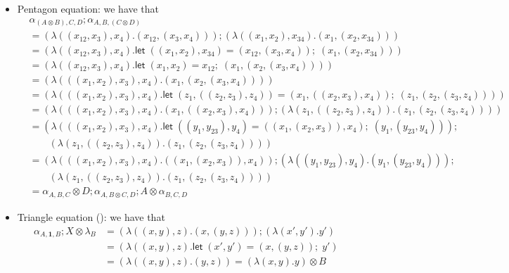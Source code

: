 \documentclass[acmsmall,screen,review]{acmart}
\newcommand{\mb}[1]{\ensuremath{\mathbf{#1}}}
\newcommand{\ms}[1]{\ensuremath{\mathsf{#1}}}
\newcommand{\letexpr}[3]{\ensuremath{\ms{let}\;#1 = #2;\;#3}}
\newcommand{\cmark}{\ding{51}}%
\begin{document}
\begin{itemize}
  \begin{itemize}
    \item Pentagon equation: we have that
    \begin{align*}
      &\alpha_{(A \otimes B), C, D} ; \alpha_{A, B, (C \otimes D)} \\
      &= (\lambda ((x_{12}, x_3), x_4) . (x_{12}, (x_3, x_4))) ; 
         (\lambda ((x_1, x_2), x_{34}) . (x_1, (x_2, x_{34}))) \\
      &= (\lambda ((x_{12}, x_3), x_4) . 
        \letexpr{((x_1, x_2), x_{34})}{(x_{12}, (x_3, x_4))}{(x_1, (x_2, x_{34}))}) \\
      &= (\lambda ((x_{12}, x_3), x_4) . 
        \letexpr{(x_1, x_2)}{x_{12}}{(x_1, (x_2, (x_3, x_4)))}) \\
      &= (\lambda (((x_1, x_2), x_3), x_4) . (x_1, (x_2, (x_3, x_4)))) \\
      &= (\lambda (((x_1, x_2), x_3), x_4) . 
        \letexpr{(z_1, ((z_2, z_3), z_4))}{(x_1, ((x_2, x_3), x_4))}{(z_1, (z_2, (z_3, z_4)))})
      \\
      &= (\lambda (((x_1, x_2), x_3), x_4) . (x_1, ((x_2, x_3), x_4))) ;
      (\lambda (z_1, ((z_2, z_3), z_4)) . (z_1, (z_2, (z_3, z_4))))
      \\
      &= (\lambda (((x_1, x_2), x_3), x_4) . 
        \letexpr{((y_1, y_{23}), y_4)}{((x_1, (x_2, x_3)), x_4)}{(y_1, (y_{23}, y_4))}) ; 
        \\ & \qquad 
      (\lambda (z_1, ((z_2, z_3), z_4)) . (z_1, (z_2, (z_3, z_4))))
      \\
      &= (\lambda (((x_1, x_2), x_3), x_4) . ((x_1, (x_2, x_3)), x_4)) ; 
      (\lambda ((y_1, y_{23}), y_4) . (y_1, (y_{23}, y_4))) ; \\ & \qquad 
      (\lambda (z_1, ((z_2, z_3), z_4)) . (z_1, (z_2, (z_3, z_4))))
      \\
      &= \alpha_{A, B, C} \otimes D ; \alpha_{A, B \otimes C, D} ; A \otimes \alpha_{B, C, D}
    \end{align*}
    \item Triangle equation (\cmark): we have that
    \begin{align*}
      \alpha_{A, \mb{1}, B} ; X \otimes \lambda_B
      &= (\lambda ((x, y), z) . (x, (y, z))) ; (\lambda (x', y') . y') \\
      &= (\lambda ((x, y), z) . \letexpr{(x', y')}{(x, (y, z))}{y'}) \\
      &= (\lambda ((x, y), z) . (y, z)) 
        = (\lambda (x, y) . y) \otimes B
        \\

\end{align*}
\end{itemize}
\end{itemize}
\end{document}
